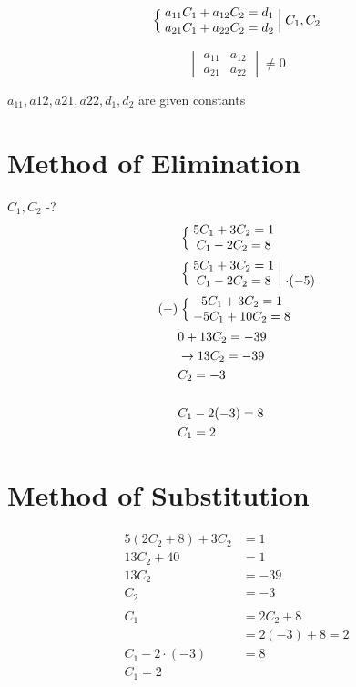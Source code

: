 \documentclass[10pt, letterpaper]{article}
\begin{document}
\begin{equation*}
\Bigm \{
\begin{matrix}
a_{11}C_1 + a_{12}C_2 =d_1\\
a_{21}C_1 + a_{22}C_2 =d_2
\end{matrix}
\Bigm | C_1, C_2
\end{equation*}

\begin{equation*}
\begin{vmatrix}
a_{11} & a_{12}\\
a_{21} & a_{22}
\end{vmatrix}
\neq 0
\end{equation*}

$a_{11}, a{12}, a{21}, a{22}, d_1, d_2$ are given constants

\section{Method of Elimination}
$C_1, C_2$ -?\\

\begin{align*}
&\Bigm \{
\begin{matrix}
5C_1 + 3C_2 = 1\\
C_1 - 2C_2 = 8
\end{matrix}
\\
&\Bigm \{
\begin{matrix}
	5C_1 + 3C_2 = 1\\
	C_1 - 2C_2 = 8
\end{matrix}
\Bigm |
\begin{matrix}
	\\
	\cdot (-5)
\end{matrix}
\\
(+) &\Bigm \{
\begin{matrix}
	5C_1 + 3C_2 = 1\\
	-5C_1 + 10C_2 = 8
\end{matrix}
\\
&0 + 13C_2 = -39\\
&\rightarrow 13C_2 = -39\\
&C_2 = -3\\
\\
&C_1 -2(-3) = 8\\
&C_1 = 2
\end{align*}

\section{Method of Substitution}
\begin{align*}
5(2C_2+8)+3C_2 &= 1\\
13C_2 + 40 &=1\\
13C_2 &= -39\\
C_2 &= -3\\
\\
C_1 &= 2C_2 + 8\\
&= 2(-3) + 8 = 2\\
C_1 - 2 \cdot (-3) &= 8\\
C_1 = 2
\end{align*}
\end{document}
